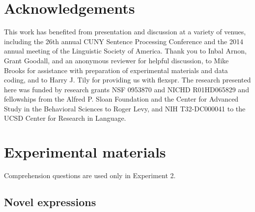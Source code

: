 \documentclass[authoryear]{elsarticle}
\begin{document}
\section*{Acknowledgements}
This work has benefited from presentation and discussion at a variety of venues, including the 26th annual CUNY Sentence Processing Conference and the 2014 annual meeting of the Linguistic Society of America. Thank you to Inbal Arnon, Grant Goodall, and an anonymous reviewer for helpful discussion, to Mike Brooks for assistance with preparation of experimental materials and data coding, and to Harry J. Tily for providing us with flexspr. The research presented here was funded by research grants NSF 0953870 and NICHD R01HD065829 and fellowships from the Alfred P. Sloan Foundation and the Center for Advanced Study in the Behavioral Sciences to Roger Levy, and NIH T32-DC000041 to the UCSD Center for Research in Language.

\appendix
\section{Experimental materials}
Comprehension questions are used only in Experiment 2.

\subsection{Novel expressions}
\end{document}
